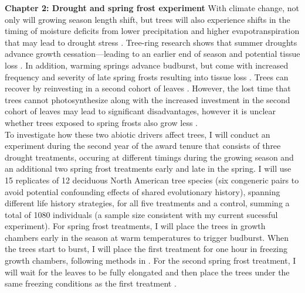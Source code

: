 \documentclass[12pt]{article}
\begin{document}
\textbf{Chapter 2: Drought and spring frost experiment}
With climate change, not only will growing season length shift, but trees will also experience shifts in the timing of moisture deficits from lower precipitation and higher evapotranspiration that may lead to drought stress \citep{dox_wood_2022}. Tree-ring research shows that summer droughts advance growth cessation---leading to an earlier end of season \citep{kang_earlier_2023} and potential tissue loss \citep{kramer_why_2012}. In addition, warming springs advance budburst, but come with increased frequency and severity of late spring frosts resulting into tissue loss \citep{baumgarten_no_2023,kramer_why_2012}. Trees can recover by reinvesting in a second cohort of leaves \citep{baumgarten_no_2023,dandrea_winters_2019}. However, the lost time that trees cannot photosynthesize along with the increased investment in the second cohort of leaves may lead to significant disadvantages, however it is unclear whether trees exposed to spring frosts also grow less \citep{chamberlain_late_2021,baumgarten_no_2023}. \\
To investigate how these two abiotic drivers affect trees, I will conduct an experiment during the second year of the award tenure that consists of three drought treatments, occuring at different timings during the growing season and an additional two spring frost treatments early and late in the spring. I will use 15 replicates of 12 deciduous North American tree species (six congeneric pairs to avoid potential confounding effects of shared evolutionary history), spanning different life history strategies, for all five treatments and a control, summing a total of 1080 individuals (a sample size consistent with my current sucessful experiment). For spring frost treatments, I will place the trees in growth chambers early in the season at warm temperatures to trigger budburst. When the trees start to burst, I will place the first treatment for one hour in freezing growth chambers, following methods in \citet{chamberlain_late_2021}. For the second spring frost treatment, I will wait for the leaves to be fully elongated and then place the trees under the same freezing conditions as the first treatment \citep{zohner_increased_2018}.\\
\end{document}
